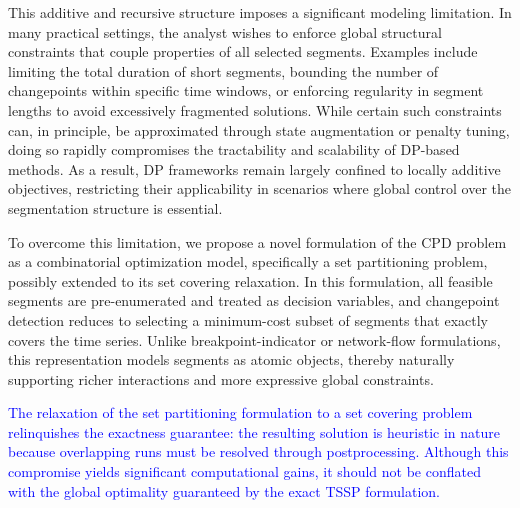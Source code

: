 \documentclass[preprints,article,submit,pdftex,moreauthors]{Definitions/mdpi}
\newcommand{\highlight}[1]{\textcolor{blue}{#1}}
\begin{document}
This additive and recursive structure imposes a significant modeling limitation. In many practical settings, the analyst wishes to enforce global structural constraints that couple properties of all selected segments. Examples include limiting the total duration of short segments, bounding the number of changepoints within specific time windows, or enforcing regularity in segment lengths to avoid excessively fragmented solutions. While certain such constraints can, in principle, be approximated through state augmentation or penalty tuning, doing so rapidly compromises the tractability and scalability of DP-based methods. As a result, DP frameworks remain largely confined to locally additive objectives, restricting their applicability in scenarios where global control over the segmentation structure is essential.

To overcome this limitation, we propose a novel formulation of the CPD problem as a combinatorial optimization model, specifically a set partitioning problem, possibly extended to its set covering relaxation. In this formulation, all feasible segments are pre-enumerated and treated as decision variables, and changepoint detection reduces to selecting a minimum-cost subset of segments that exactly covers the time series. Unlike breakpoint-indicator or network-flow formulations, this representation models segments as atomic objects, thereby naturally supporting richer interactions and more expressive global constraints.
 
\highlight{The relaxation of the set partitioning formulation to a set covering problem relinquishes the exactness guarantee: the resulting solution is heuristic in nature because overlapping runs must be resolved through postprocessing. Although this compromise yields significant computational gains, it should not be conflated with the global optimality guaranteed by the exact TSSP formulation.}
\end{document}
